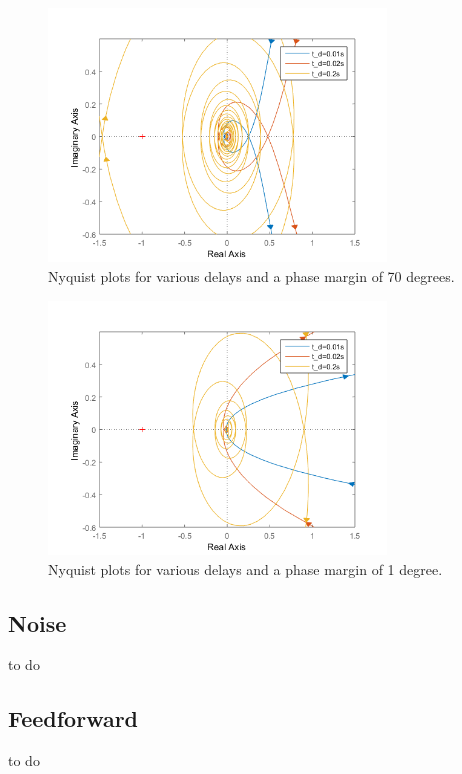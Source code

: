 \begin{figure}[H]
    \centering
    \includegraphics[width=0.8\textwidth]{resources/png/nyquist-70.png}
    \caption{Nyquist plots for various delays and a phase margin of 70 degrees.}
    \label{fig:nyquist-70}
\end{figure}
\begin{figure}[H]
    \centering
    \includegraphics[width=0.8\textwidth]{resources/png/nyquist-1.png}
    \caption{Nyquist plots for various delays and a phase margin of 1 degree.}
    \label{fig:nyquist-1}
\end{figure}

\subsection{Noise}
to do

\subsection{Feedforward}
to do

